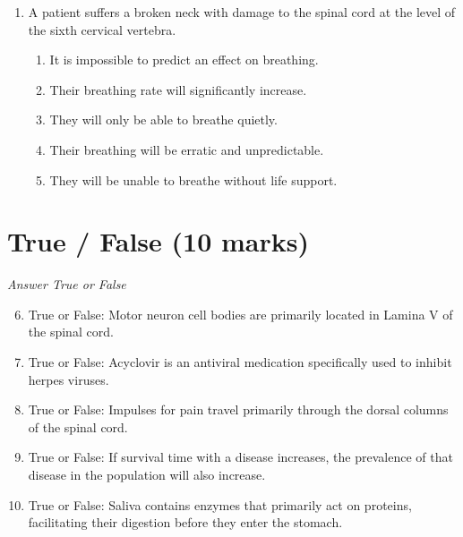 \documentclass[12pt]{article}
\begin{document}
\begin{enumerate}[label=\arabic*.]
\begin{enumerate}[label=(\alph*)]
    \item Only the mandibular canal and hard palate
    \item The mandibular canal, maxillary sinus, hard palate, zygomatic arch, and ethmoid sinus
    \item The mandibular canal, maxillary sinus, hard palate, zygomatic arch, and frontal sinus
    \item The mandibular canal and maxillary sinus
    \item The mandibular canal
\end{enumerate}
\item A patient suffers a broken neck with damage to the spinal cord at the level of the sixth
cervical vertebra.
\begin{enumerate}[label=(\alph*)]
    \item It is impossible to predict an effect on breathing.
    \item Their breathing rate will significantly increase.
    \item They will only be able to breathe quietly.
    \item Their breathing will be erratic and unpredictable.
    \item They will be unable to breathe without life support.
\end{enumerate}
\end{enumerate}

\section*{True / False (10 marks)}
\textit{Answer True or False}
\begin{enumerate}[label=\arabic*.]
\setcounter{enumi}{5}
\item True or False: Motor neuron cell bodies are primarily located in Lamina V of the spinal cord.
\item True or False: Acyclovir is an antiviral medication specifically used to inhibit herpes viruses.
\item True or False: Impulses for pain travel primarily through the dorsal columns of the spinal cord.
\item True or False: If survival time with a disease increases, the prevalence of that disease in the population will also increase.
\item True or False: Saliva contains enzymes that primarily act on proteins, facilitating their digestion before they enter the stomach.
\end{enumerate}
\end{document}
